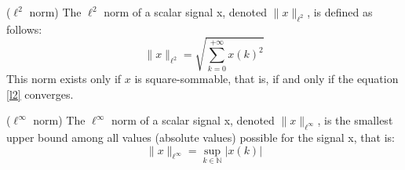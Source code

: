 	\begin{thdef}\label{l_1} ($\ell^2$ norm)
		The $\ell^2$ norm of a scalar signal x, denoted $\|x\|_{\ell^2}$, is defined as follows:
		\begin{equation} \label{l2}
				\|x\|_{\ell^2}=\sqrt{\sum_{k=0}^{+\infty}x(k)^2}
		\end{equation}
		This norm exists only if $x$ is square-sommable, that is, if and only if the equation \ref{l2} converges.
	\end{thdef}

	\begin{thdef}\label{l_inf} ($\ell^\infty$ norm)
		The $\ell^\infty$ norm of a scalar signal x, denoted $\|x\|_{\ell^\infty}$, is the smallest upper bound among all values (absolute values) possible for the signal x, that is:
		\begin{equation} \label{l3}
				\|x\|_{\ell^\infty}=\sup_{k\in \mathbb{N}}|x(k)|
		\end{equation}
	\end{thdef}


